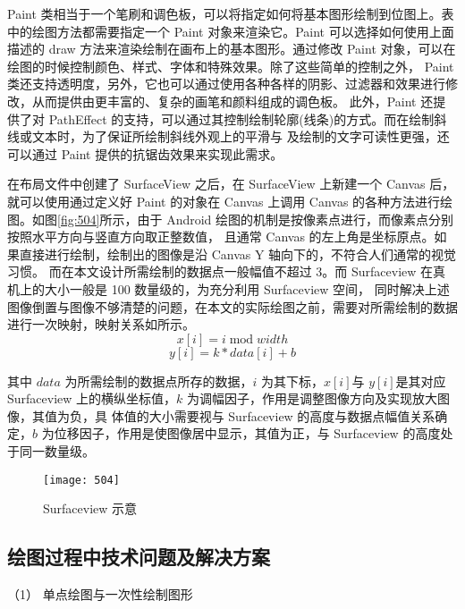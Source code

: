 Paint 类相当于一个笔刷和调色板，可以将指定如何将基本图形绘制到位图上。表中的绘图方法都需要指定一个 Paint 对象来渲染它。Paint 可以选择如何使用上面描述的 
draw 方法来渲染绘制在画布上的基本图形。通过修改 Paint 对象，可以在绘图的时候控制颜色、样式、字体和特殊效果。除了这些简单的控制之外，
Paint 类还支持透明度，另外，它也可以通过使用各种各样的阴影、过滤器和效果进行修改，从而提供由更丰富的、复杂的画笔和颜料组成的调色板。
此外，Paint 还提供了对 PathEffect 的支持，可以通过其控制绘制轮廓(线条)的方式。而在绘制斜线或文本时，为了保证所绘制斜线外观上的平滑与
及绘制的文字可读性更强，还可以通过 Paint 提供的抗锯齿效果来实现此需求。 

在布局文件中创建了 SurfaceView 之后，在 SurfaceView 上新建一个 Canvas 后，就可以使用通过定义好 Paint 的对象在 Canvas 上调用 
Canvas 的各种方法进行绘图。如图\autoref{fig:504}所示，由于 Android 绘图的机制是按像素点进行，而像素点分别按照水平方向与竖直方向取正整数值，
且通常 Canvas 的左上角是坐标原点。如果直接进行绘制，绘制出的图像是沿 Canvas Y 轴向下的，不符合人们通常的视觉习惯。
而在本文设计所需绘制的数据点一般幅值不超过 3。而 Surfaceview 在真机上的大小一般是 100 数量级的，为充分利用 Surfaceview 空间，
同时解决上述图像倒置与图像不够清楚的问题，在本文的实际绘图之前，需要对所需绘制的数据进行一次映射，映射关系如所示。 
\begin{equation}
    \label{equ:501}
    x[i]= i \mathop{mod} width
\end{equation}
\begin{equation}
    \label{equ:502}
    y[i]= k * data[i] + b
\end{equation}

其中 $data$ 为所需绘制的数据点所存的数据，$i$ 为其下标，$x[i]$与 $y[i]$是其对应 Surfaceview 上的横纵坐标值，$k$ 为调幅因子，作用是调整图像方向及实现放大图像，其值为负，具 
体值的大小需要视与 Surfaceview 的高度与数据点幅值关系确定，$b$ 为位移因子，作用是使图像居中显示，其值为正，与 Surfaceview 的高度处于同一数量级。 
\begin{figure}[htbp]
    \centering
    \texttt{[image: 504]}
    \caption{\label{fig:504}Surfaceview 示意}
\end{figure}

\subsection{绘图过程中技术问题及解决方案} 

（1）	单点绘图与一次性绘制图形 


